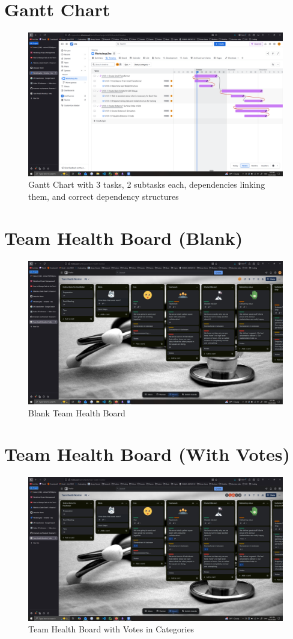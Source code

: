 \documentclass[12pt]{article}
\begin{document}
\section{Gantt Chart}

\begin{figure}[H]
    \centering
    \includegraphics[width=0.75\linewidth]{images/gantt_chart_q3.png}
    \caption{Gantt Chart with 3 tasks, 2 subtasks each, dependencies linking them, and correct dependency structures}\label{fig:q3}
\end{figure}

\section{Team Health Board (Blank)}

\begin{figure}[H]
    \centering
    \includegraphics[width=0.75\linewidth]{images/trello_board_q4_actually.jpg}
    \caption{Blank Team Health Board}\label{fig:q4}
\end{figure}

\section{Team Health Board (With Votes)}

\begin{figure}[H]
    \centering
    \includegraphics[width=0.75\linewidth]{images/trello_board_q5.jpg}
    \caption{Team Health Board with Votes in Categories}\label{fig:q5}
\end{figure}
\end{document}
